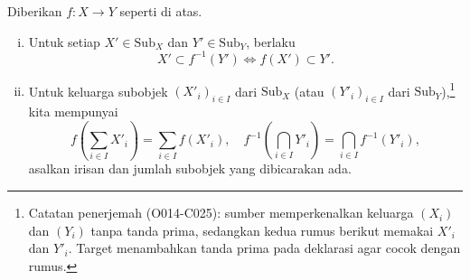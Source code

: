 \begin{lema}\label{prop:image-sum-preimage-intersection}
	Diberikan $f:X\to Y$ seperti di atas.
	\begin{enumerate}[(i)]
		\item Untuk setiap $X'\in\mathrm{Sub}_X$ dan
		$Y'\in\mathrm{Sub}_Y$, berlaku
		\[ X' \subset f^{-1}(Y') \iff f(X') \subset Y'. \]
		\item Untuk keluarga subobjek $(X'_i)_{i\in I}$ dari
		$\mathrm{Sub}_X$ (atau $(Y'_i)_{i\in I}$ dari
		$\mathrm{Sub}_Y$),\footnote{Catatan penerjemah (O014-C025): sumber
		memperkenalkan keluarga $(X_i)$ dan $(Y_i)$ tanpa tanda prima, sedangkan
		kedua rumus berikut memakai $X'_i$ dan $Y'_i$. Target menambahkan tanda
		prima pada deklarasi agar cocok dengan rumus.} kita mempunyai
		\[ f\left( \sum_{i \in I} X'_i \right) = \sum_{i \in I} f(X'_i), \quad f^{-1}\left( \bigcap_{i \in I} Y'_i \right) = \bigcap_{i \in I} f^{-1}(Y'_i), \]
		asalkan irisan dan jumlah subobjek yang dibicarakan ada.
	\end{enumerate}
\end{lema}
